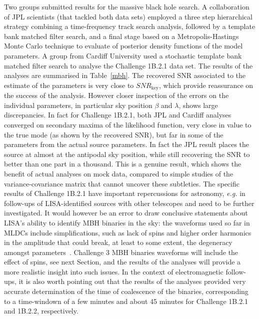 \documentclass{iopart}
\begin{document}
Two groups submitted results for the massive black hole search. A collaboration of JPL scientists (that tackled both data sets) employed a three step hierarchical strategy combining a time-frequency track search analysis, followed by a template bank matched filter search, and a final stage based on a Metropolis-Hastings Monte Carlo technique to evaluate of posterior density functions of the model parameters. A group from Cardiff University used a stochastic template bank matched filter search\cite{cardiffmbh} to analyse the Challenge 1B.2.1 data set. The results of the analyses are summarised in Table~\ref{mbh}.  The recovered SNR associated to the estimate of the parameters is very close to $SNR_\mathrm{key}$, which provide reassurance on the success of the analysis. However closer inspection of the errors on the individual parameters, in particular sky position $\beta$ and $\lambda$, shows large discrepancies. In fact for Challenge 1B.2.1, both JPL and Cardiff analyses converged on secondary maxima of the likelihood function, very close in value to the true mode (as shown by the recovered SNR), but far in some of the parameters from the actual source parameters. In fact the JPL result places the source at almost at the antipodal sky position, while still recovering the SNR to better than one part in a thousand. This is a genuine result, which shows the benefit of actual analyses on mock data, compared to simple studies of the variance-covariance matrix that cannot uncover these subtleties. The specific results of Challenge 1B.2.1  have important repercussions for astronomy, \emph{e.g.} in follow-ups of LISA-identified sources with other telescopes and need to be further investigated. It would however be an error to draw conclusive statements about LISA's ability to identify MBH binaries in the sky: the waveforms used so far in MLDCs include simplifications, such as lack of spins and higher order harmonics in the amplitude that could break, at least to some extent, the degeneracy amongst parameters~\cite{Vecchio, LangHughes, TriasSintes, PorterCornish}. Challenge 3 MBH binaries waveforms will include the effect of spins, see next Section, and the results of the analyses will provide a more realistic insight into such issues. In the context of electromagnetic follow-ups, it is also worth pointing out that the results of the analyses provided very accurate determination of the time of coalescence of the binaries, corresponding to a time-windown of a few minutes and about 45 minutes for Challenge 1B.2.1 and 1B.2.2, respectively.
\end{document}
